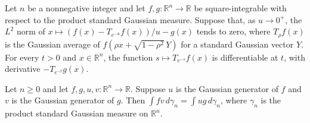 \begin{theorem}
\label{BooleanAnalysis.GaussianSpace.hasDerivAt_gaussianNoise_exp}
\leanok
{}
Let $n$ be a nonnegative integer and let $f,g:\mathbb R^n\to\mathbb R$ be
square-integrable with respect to the product standard Gaussian measure. Suppose that,
as $u\to0^+$, the $L^2$ norm of $x\mapsto (f(x)-T_{e^{-u}}f(x))/u-g(x)$ tends to zero,
where $T_\rho f(x)$ is the Gaussian average of $f(\rho x+\sqrt{1-\rho^2}\,Y)$ for a
standard Gaussian vector $Y$. For every $t>0$ and $x\in\mathbb R^n$, the function
$s\mapsto T_{e^{-s}}f(x)$ is differentiable at $t$, with derivative $-T_{e^{-t}}g(x)$.
\end{theorem}

\begin{theorem}
\label{BooleanAnalysis.GaussianSpace.gaussianGenerator_selfAdjoint}
\leanok
{}
Let $n\ge0$ and let $f,g,u,v:\mathbb R^n\to\mathbb R$. Suppose $u$ is the Gaussian
generator of $f$ and $v$ is the Gaussian generator of $g$. Then $\int f
v\,d\gamma_n=\int u g\,d\gamma_n$, where $\gamma_n$ is the product standard Gaussian
measure on $\mathbb R^n$.
\end{theorem}


